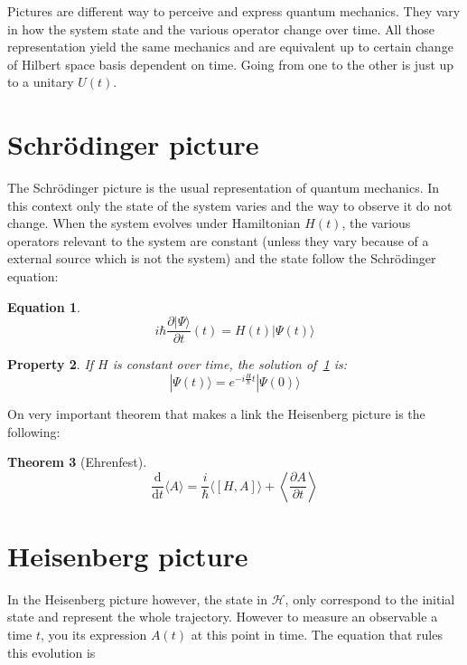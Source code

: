 \documentclass[10pt,a4paper]{report}
\theoremstyle{plain}
\newtheorem{thm}{Theorem}[chapter]
\newtheorem{prop}[thm]{Property}
\theoremstyle{definition}
\newtheorem{eqn}[thm]{Equation}
\theoremstyle{remark}
\newcommand{\ket}[1]{|#1\rangle}
\newcommand{\dd}{\mathrm{d}}
\newcommand{\der}[2]{\frac{\dd{#1}}{\dd{#2}}}
\newcommand{\dpar}[2]{\frac{\partial{#1}}{\partial{#2}}}
\begin{document}
Pictures are different way to perceive and express quantum mechanics. They vary
in how the system state and the various operator change over time. All those
representation yield the same mechanics and are equivalent up to certain change
of Hilbert space basis dependent on time. Going from one to the other is just up
to a unitary $U(t)$.


\section{Schrödinger picture}

The Schrödinger picture is the usual representation of quantum mechanics. In
this context only the state of the system varies and the way to observe it do
not change. When the system evolves under Hamiltonian $H(t)$,
the various operators relevant to the system are constant (unless they vary
because of a external source which is not the system) and the
state follow the Schrödinger equation:
\begin{eqn}\label{eqn:schro}
\[i\hbar \frac{\partial \ket \Psi}{\partial t} (t) = H(t) \ket {\Psi(t)} \]
\end{eqn}

\begin{prop}
  If $H$ is constant over time, the solution of~\cref{eqn:schro} is:
  \[ \ket {\Psi(t)} = e^{-i\frac H\hbar t}\ket{\Psi(0)}\]
\end{prop}

On very important theorem that makes a link the Heisenberg picture is the
following:

\begin{thm}[Ehrenfest]\label{thm:ehren}
  \[\der{}t\langle A\rangle = \frac i\hbar\langle[H,A]\rangle + \left\langle\dpar
      A t \right\rangle\]
\end{thm}



\section{Heisenberg picture}

In the Heisenberg picture however, the state in $\mathcal{H}$, only correspond
to the initial state and represent the whole trajectory. However to measure an
observable a time $t$, you its expression $A(t)$ at this point in time. The
equation that rules this evolution is
\end{document}
